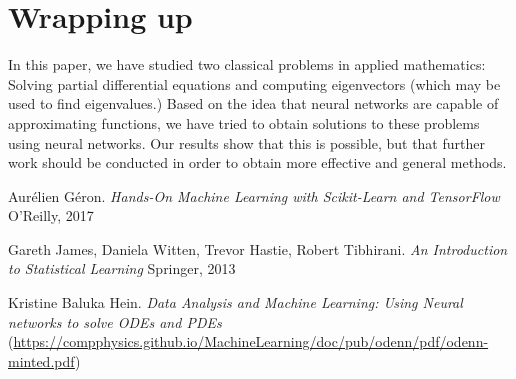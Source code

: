 \documentclass{article}
\begin{document}
\section{Wrapping up}
In this paper, we have studied two classical problems in applied mathematics: Solving partial differential equations and computing eigenvectors (which may be used to find eigenvalues.) Based on the idea that neural networks are capable of approximating functions, we have tried to obtain solutions to these problems using neural networks. Our results show that this is possible, but that further work should be conducted in order to obtain more effective and general methods.

\begin{thebibliography}{3}
    Aur\'elien G\'eron.
    \textit{Hands-On Machine Learning with Scikit-Learn and TensorFlow}
    O'Reilly, 2017

    Gareth James, Daniela Witten, Trevor Hastie, Robert Tibhirani.
    \textit{An Introduction to Statistical Learning}
    Springer, 2013

    Kristine Baluka Hein.
    \textit{Data Analysis and Machine Learning: Using Neural networks to solve ODEs and PDEs}
    (\url{https://compphysics.github.io/MachineLearning/doc/pub/odenn/pdf/odenn-minted.pdf})
\end{thebibliography}
\end{document}
